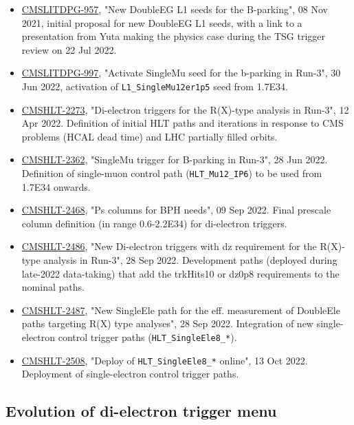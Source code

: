 \begin{itemize}
\item
  \href{https://its.cern.ch/jira/browse/CMSLITDPG-957}{CMSLITDPG-957},
  "New DoubleEG L1 seeds for the B-parking", 08 Nov 2021, initial
  proposal for new DoubleEG L1 seeds, with a link to a presentation
  from Yuta making the physics case during the TSG trigger review on
  22 Jul 2022.
\item
  \href{https://its.cern.ch/jira/browse/CMSLITDPG-997}{CMSLITDPG-997},
  "Activate SingleMu seed for the b-parking in Run-3", 30 Jun 2022,
  activation of \texttt{L1\_SingleMu12er1p5} seed from 1.7E34.
\item \href{https://its.cern.ch/jira/browse/CMSHLT-2273}{CMSHLT-2273},
  "Di-electron triggers for the R(X)-type analysis in Run-3", 12 Apr
  2022. Definition of initial HLT paths and iterations in response to
  CMS problems (\eg HCAL dead time) and LHC partially filled orbits.
\item \href{https://its.cern.ch/jira/browse/CMSHLT-2362}{CMSHLT-2362},
  "SingleMu trigger for B-parking in Run-3", 28 Jun 2022. Definition
  of single-muon control path (\texttt{HLT\_Mu12\_IP6}) to be used
  from 1.7E34 onwards.
\item \href{https://its.cern.ch/jira/browse/CMSHLT-2468}{CMSHLT-2468},
  "Ps columns for BPH needs", 09 Sep 2022. Final prescale column
  definition (in range 0.6-2.2E34) for di-electron triggers.
\item \href{https://its.cern.ch/jira/browse/CMSHLT-2486}{CMSHLT-2486},
  "New Di-electron triggers with dz requirement for the R(X)-type
  analysis in Run-3", 28 Sep 2022. Development paths (deployed during
  late-2022 data-taking) that add the trkHits10 or dz0p8 requirements
  to the nominal paths.
\item \href{https://its.cern.ch/jira/browse/CMSHLT-2487}{CMSHLT-2487},
  "New SingleEle path for the eff. measurement of DoubleEle paths
  targeting R(X) type analyses", 28 Sep 2022. Integration of new
  single-electron control trigger paths (\texttt{HLT\_SingleEle8\_*}).
\item \href{https://its.cern.ch/jira/browse/CMSHLT-2508}{CMSHLT-2508},
  "Deploy of \texttt{HLT\_SingleEle8\_*} online", 13 Oct
  2022. Deployment of single-electron control trigger paths.
\end{itemize}
  
\subsection{Evolution of di-electron trigger menu}

